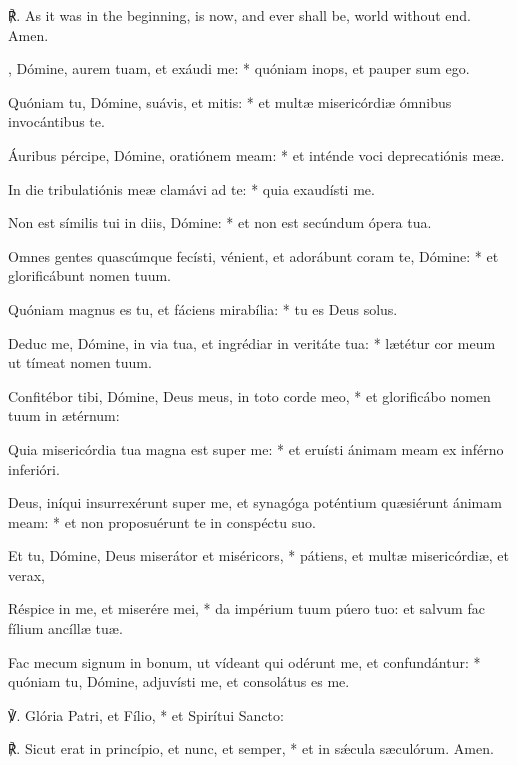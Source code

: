 {℟. As it was in the beginning, is now, and ever shall be, world without end. Amen.}{, Dómine, aurem tuam, et exáudi me: * quóniam inops, et pauper sum ego.\par
{}
Quóniam tu, Dómine, suávis, et mitis: * et mult{\ae} misericórdi{\ae} ómnibus invocántibus te.\par
Áuribus pércipe, Dómine, oratiónem meam: * et inténde voci deprecatiónis me{\ae}.\par
In die tribulatiónis me{\ae} clamávi ad te: * quia exaudísti me.\par
Non est símilis tui in diis, Dómine: * et non est secúndum ópera tua.\par
Omnes gentes quascúmque fecísti, vénient, et adorábunt coram te, Dómine: * et glorificábunt nomen tuum.\par
Quóniam magnus es tu, et fáciens mirabília: * tu es Deus solus.\par
Deduc me, Dómine, in via tua, et ingrédiar in veritáte tua: * l{\ae}tétur cor meum ut tímeat nomen tuum.\par
Confitébor tibi, Dómine, Deus meus, in toto corde meo, * et glorificábo nomen tuum in {\ae}térnum:\par
Quia misericórdia tua magna est super me: * et eruísti ánimam meam ex inférno inferióri.\par
Deus, iníqui insurrexérunt super me, et synagóga poténtium qu{\ae}siérunt ánimam meam: * et non proposuérunt te in conspéctu suo.\par
Et tu, Dómine, Deus miserátor et miséricors, * pátiens, et mult{\ae} misericórdi{\ae}, et verax,\par
Réspice in me, et miserére mei, * da impérium tuum púero tuo: et salvum fac fílium ancíll{\ae} tu{\ae}.\par
Fac mecum signum in bonum, ut vídeant qui odérunt me, et confundántur: * quóniam tu, Dómine, adjuvísti me, et consolátus es me.\par
℣. Glória Patri, et Fílio, * et Spirítui Sancto:\par
℟. Sicut erat in princípio, et nunc, et semper, * et in sǽcula s{\ae}culórum. Amen.}
